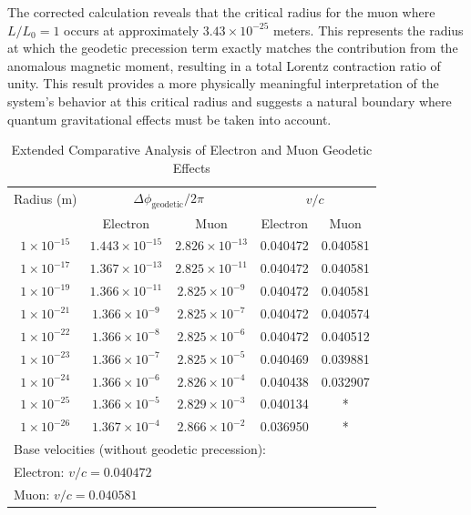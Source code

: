 \documentclass[%
 reprint,
 amsmath,amssymb,
 aps,
]{revtex4-1}
\numberwithin{equation}{section}%
\begin{document}
The corrected calculation reveals that the critical radius for the muon where $L/L_0 = 1$ occurs at approximately $3.43 \times 10^{-25}$ meters. This represents the radius at which the geodetic precession term exactly matches the contribution from the anomalous magnetic moment, resulting in a total Lorentz contraction ratio of unity. This result provides a more physically meaningful interpretation of the system's behavior at this critical radius and suggests a natural boundary where quantum gravitational effects must be taken into account.


\begin{table}[t!]
    \renewcommand\arraystretch{1.3}
    \caption{Extended Comparative Analysis of Electron and Muon Geodetic Effects}
    \begin{tabular}{ccccc}
    \hline
    Radius (m) & \multicolumn{2}{c}{$\Delta \phi_{\text{geodetic}}/2\pi$} & \multicolumn{2}{c}{$v/c$} \\
    & Electron & Muon & Electron & Muon \\
    \hline
    $1 \times 10^{-15}$ & $1.443 \times 10^{-15}$ & $2.826 \times 10^{-13}$ & 0.040472 & 0.040581 \\
    $1 \times 10^{-17}$ & $1.367 \times 10^{-13}$ & $2.825 \times 10^{-11}$ & 0.040472 & 0.040581 \\
    $1 \times 10^{-19}$ & $1.366 \times 10^{-11}$ & $2.825 \times 10^{-9}$ & 0.040472 & 0.040581 \\
    $1 \times 10^{-21}$ & $1.366 \times 10^{-9}$ & $2.825 \times 10^{-7}$ & 0.040472 & 0.040574 \\
    $1 \times 10^{-22}$ & $1.366 \times 10^{-8}$ & $2.825 \times 10^{-6}$ & 0.040472 & 0.040512 \\
    $1 \times 10^{-23}$ & $1.366 \times 10^{-7}$ & $2.825 \times 10^{-5}$ & 0.040469 & 0.039881 \\
    $1 \times 10^{-24}$ & $1.366 \times 10^{-6}$ & $2.826 \times 10^{-4}$ & 0.040438 & 0.032907 \\
    $1 \times 10^{-25}$ & $1.366 \times 10^{-5}$ & $2.829 \times 10^{-3}$ & 0.040134 & * \\
    $1 \times 10^{-26}$ & $1.367 \times 10^{-4}$ & $2.866 \times 10^{-2}$ & 0.036950 & * \\
    \hline
    \multicolumn{5}{l}{Base velocities (without geodetic precession):} \\
    \multicolumn{5}{l}{Electron: $v/c = 0.040472$} \\
    \multicolumn{5}{l}{Muon: $v/c = 0.040581$} \\
    \hline
    \end{tabular}
    \label{table:extended_comparative}
\end{table}
\end{document}
